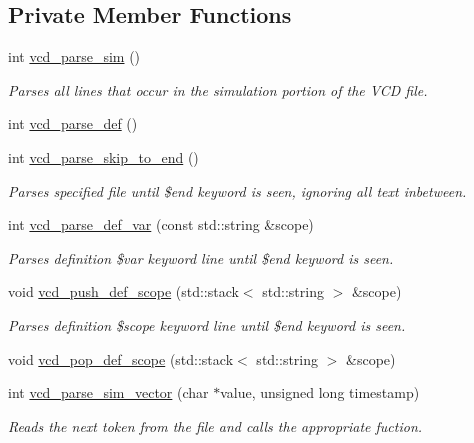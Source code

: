 \subsection*{Private Member Functions}
\begin{DoxyCompactItemize}
\item 
int \hyperlink{classvcd__parser_a591daeaca11ad1bea3fd9a3c5c4b99de}{vcd\+\_\+parse\+\_\+sim} ()
\begin{DoxyCompactList}\small\item\em Parses all lines that occur in the simulation portion of the V\+CD file. \end{DoxyCompactList}\item 
int \hyperlink{classvcd__parser_af2b5f48a0d18667c418a500fb78b52e7}{vcd\+\_\+parse\+\_\+def} ()
\item 
int \hyperlink{classvcd__parser_a8bb5288c3fe26415a1a154a1edabf418}{vcd\+\_\+parse\+\_\+skip\+\_\+to\+\_\+end} ()
\begin{DoxyCompactList}\small\item\em Parses specified file until \$end keyword is seen, ignoring all text inbetween. \end{DoxyCompactList}\item 
int \hyperlink{classvcd__parser_add86b6565edba7e85a6508594798f56a}{vcd\+\_\+parse\+\_\+def\+\_\+var} (const std\+::string \&scope)
\begin{DoxyCompactList}\small\item\em Parses definition \$var keyword line until \$end keyword is seen. \end{DoxyCompactList}\item 
void \hyperlink{classvcd__parser_a94636524ca1126b352560c72b646a8cc}{vcd\+\_\+push\+\_\+def\+\_\+scope} (std\+::stack$<$ std\+::string $>$ \&scope)
\begin{DoxyCompactList}\small\item\em Parses definition \$scope keyword line until \$end keyword is seen. \end{DoxyCompactList}\item 
void \hyperlink{classvcd__parser_a59e4c34514e6722d541aa013d02eaa32}{vcd\+\_\+pop\+\_\+def\+\_\+scope} (std\+::stack$<$ std\+::string $>$ \&scope)
\item 
int \hyperlink{classvcd__parser_aa27eaa7b2cd3eb398d6b06a6253cc3be}{vcd\+\_\+parse\+\_\+sim\+\_\+vector} (char $\ast$value, unsigned long timestamp)
\begin{DoxyCompactList}\small\item\em Reads the next token from the file and calls the appropriate fuction. \end{DoxyCompactList}\item 

\end{DoxyCompactItemize}
